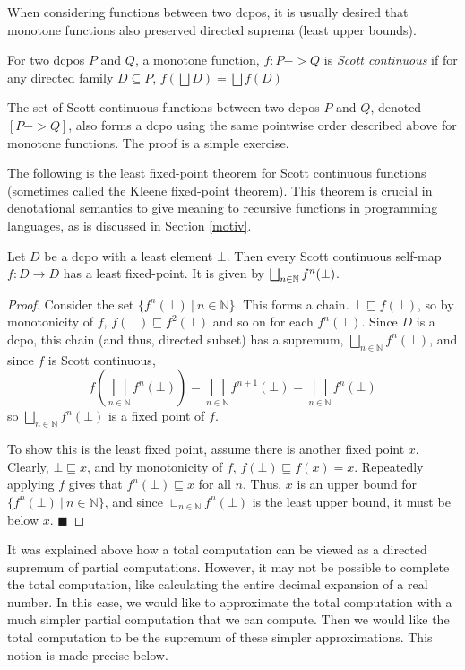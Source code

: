 When considering functions between two dcpos, it is usually desired that monotone functions also preserved directed suprema (least upper bounds).

\begin{definition}
For two dcpos $P$ and $Q$, a monotone function, $f:P->Q$ is \emph{Scott continuous} if for any directed family $D\subseteq P$, $f(\bigsqcup D) = \bigsqcup f(D)$
\end{definition}

The set of Scott continuous functions between two dcpos $P$ and $Q$, denoted $[P->Q]$, also forms a dcpo using the same pointwise order described above for monotone functions.  The proof is a simple exercise.

The following is the least fixed-point theorem for Scott continuous functions (sometimes called the Kleene fixed-point theorem).  This theorem is crucial in denotational semantics to give meaning to recursive functions in programming languages, as is discussed in Section \ref{motiv}.  

\begin{theorem}
Let $D$ be a dcpo with a least element $\bot$.  Then every Scott continuous self-map $f:D\rightarrow D$ has a least fixed-point.  
It is given by $\bigsqcup_{n\in{\mathbb N}} f^n(\bot)$.
\end{theorem}
\begin{proof}
Consider the set $\{f^{n}(\bot)\ |\ n\in \mathbb{N}\}$.  This forms a chain.  $\bot \sqsubseteq f(\bot)$, so by monotonicity of $f$, $f(\bot)\sqsubseteq f^{2}(\bot)$ and so on for each $f^{n}(\bot)$. Since $D$ is a dcpo, this chain (and thus, directed subset) has a supremum, $\bigsqcup_{n\in \mathbb{N}}f^{n}(\bot)$, and since $f$ is Scott continuous, \[f (\bigsqcup_{n\in \mathbb{N}}f^{n}(\bot)) = \bigsqcup_{n\in \mathbb{N}}f^{n+1}(\bot) = \bigsqcup_{n\in \mathbb{N}}f^{n}(\bot)\] so $\bigsqcup_{n\in \mathbb{N}}f^{n}(\bot)$ is a fixed point of $f$.

To show this is the least fixed point, assume there is another fixed point $x$.  Clearly, $\bot \sqsubseteq x$, and by monotonicity of $f$, $f(\bot) \sqsubseteq f(x) = x$.  Repeatedly applying $f$ gives that $f^{n}(\bot) \sqsubseteq x$ for all $n$.  Thus, $x$ is an upper bound for $\{f^{n}(\bot)\ |\ n\in \mathbb{N}\}$, and since $\sqcup_{n\in \mathbb{N}}f^{n}(\bot)$ is the least upper bound, it must be below $x$.  \hfill$\blacksquare$
\end{proof} 

It was explained above how a total computation can be viewed as a directed supremum of partial computations. However, it may not be possible to complete the total computation, like calculating the entire decimal expansion of a real number.  In this case, we would like to approximate the total computation with a much simpler partial computation that we can compute.  Then we would like the total computation to be the supremum of these simpler approximations.  This notion is made precise below.

